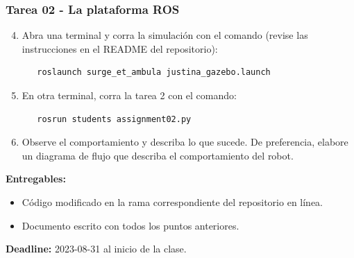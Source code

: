 \begin{frame}[containsverbatim]\frametitle{Tarea 02 - La plataforma ROS}
  \begin{enumerate}
    \setcounter{enumi}{3}
  \item Abra una terminal y corra la simulación con el comando (revise las instrucciones en el README del repositorio):
    \begin{verbatim}
   roslaunch surge_et_ambula justina_gazebo.launch
\end{verbatim}
  \item En otra terminal, corra la tarea 2 con el comando:
    \begin{verbatim}
   rosrun students assignment02.py
\end{verbatim}
  \item Observe el comportamiento y describa lo que sucede. De preferencia, elabore un diagrama de flujo que describa el comportamiento del robot.
  \end{enumerate}
  \[\]
  \textbf{Entregables:}
  \begin{itemize}
  \item Código modificado en la rama correspondiente del repositorio en línea.
  \item Documento escrito con todos los puntos anteriores. 
  \end{itemize}
  \textbf{Deadline: } 2023-08-31 al inicio de la clase. 
\end{frame}


